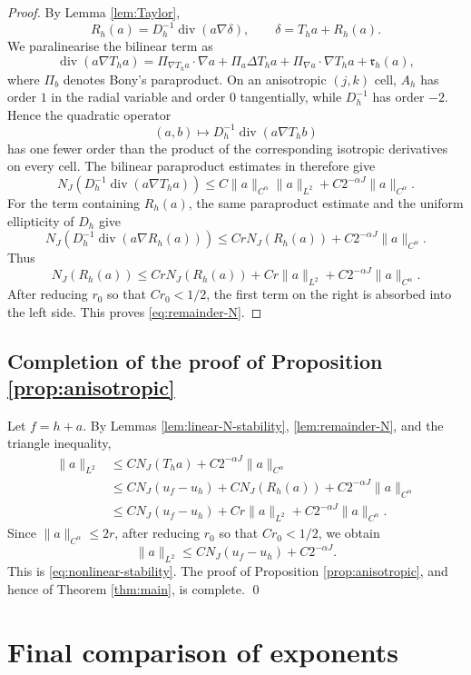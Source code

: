 \documentclass[11pt,a4paper]{article}
\theoremstyle{remark}
\numberwithin{equation}{section}
\newcommand{\Div}{\operatorname{div}}
\begin{document}
\begin{proof}
By Lemma \ref{lem:Taylor},
\[
R_h(a)=D_h^{-1}\Div(a\nabla\delta),
\qquad
\delta=T_ha+R_h(a).
\]
We paralinearise the bilinear term as
\[
\Div(a\nabla T_ha)
=
\Pi_{\nabla T_ha}\cdot\nabla a
+
\Pi_a\Delta T_ha
+
\Pi_{\nabla a}\cdot\nabla T_ha
+
\mathfrak r_h(a),
\]
where $\Pi_b$ denotes Bony's paraproduct. On an anisotropic $(j,k)$ cell,
$A_h$ has order $1$ in the radial variable and order $0$ tangentially, while
$D_h^{-1}$ has order $-2$. Hence the quadratic operator
\[
(a,b)\mapsto D_h^{-1}\Div(a\nabla T_hb)
\]
has one fewer order than the product of the corresponding isotropic
derivatives on every cell. The bilinear paraproduct estimates in
\cite[Chapter 3]{TaylorTools} therefore give
\[
N_J(D_h^{-1}\Div(a\nabla T_ha))
\leq
C\|a\|_{C^\alpha}\|a\|_{L^2}
+
C2^{-\alpha J}\|a\|_{C^\alpha}.
\]
For the term containing $R_h(a)$, the same paraproduct estimate and the
uniform ellipticity of $D_h$ give
\[
N_J(D_h^{-1}\Div(a\nabla R_h(a)))
\leq
CrN_J(R_h(a))
+
C2^{-\alpha J}\|a\|_{C^\alpha}.
\]
Thus
\[
N_J(R_h(a))
\leq
CrN_J(R_h(a))
+
Cr\|a\|_{L^2}
+
C2^{-\alpha J}\|a\|_{C^\alpha}.
\]
After reducing $r_0$ so that $Cr_0<1/2$, the first term on the right is
absorbed into the left side. This proves \eqref{eq:remainder-N}.
\end{proof}

\subsection{Completion of the proof of Proposition
\ref{prop:anisotropic}}

Let $f=h+a$. By Lemmas \ref{lem:linear-N-stability},
\ref{lem:remainder-N}, and the triangle inequality,
\begin{align*}
\|a\|_{L^2}
&\leq
CN_J(T_ha)+C2^{-\alpha J}\|a\|_{C^\alpha}\\
&\leq
CN_J(u_f-u_h)
+CN_J(R_h(a))
+C2^{-\alpha J}\|a\|_{C^\alpha}\\
&\leq
CN_J(u_f-u_h)
+Cr\|a\|_{L^2}
+C2^{-\alpha J}\|a\|_{C^\alpha}.
\end{align*}
Since $\|a\|_{C^\alpha}\leq 2r$, after reducing $r_0$ so that $Cr_0<1/2$,
we obtain
\[
\|a\|_{L^2}
\leq
CN_J(u_f-u_h)+C2^{-\alpha J}.
\]
This is \eqref{eq:nonlinear-stability}. The proof of Proposition
\ref{prop:anisotropic}, and hence of Theorem \ref{thm:main}, is complete.
\qed

\section{Final comparison of exponents}
\end{document}

